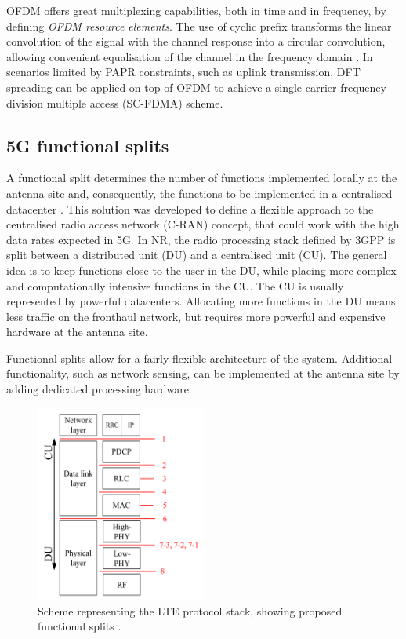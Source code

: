 	OFDM offers great multiplexing capabilities, both in time and in frequency, by defining  \textit{OFDM resource elements}. The use of cyclic prefix transforms the linear convolution of the signal with the channel response into a circular convolution, allowing convenient equalisation of the channel in the frequency domain \cite{Wild_Grudnitsky_Mandelli_Henninger_Guan_Schaich_2023}. In scenarios limited by PAPR constraints, such as uplink transmission, DFT spreading can  be applied on top of OFDM to achieve a single-carrier frequency division multiple access (SC-FDMA) scheme.
	
	\subsection{5G functional splits}
	
	A functional split determines the number of functions implemented locally at the antenna site and, consequently, the functions to be implemented in a centralised datacenter \cite{Larsen_Checko_Christiansen_2019}. 
 	This solution was developed to define a flexible approach to the centralised radio access network (C-RAN) concept, that could work with the high data rates expected in 5G. 
	In NR, the radio processing stack defined by 3GPP is split between a distributed unit (DU) and a centralised unit (CU). 
	The general idea is to keep functions close to the user in the DU, while placing more complex and computationally intensive functions in the CU. The CU is usually represented by powerful datacenters.
	Allocating more functions in the DU means less traffic on the fronthaul network, but requires more powerful and expensive hardware at the antenna site.
	 
	Functional splits allow for a fairly flexible architecture of the system. Additional functionality, such as network sensing, can be implemented at the antenna site by adding dedicated processing hardware.

	\begin{figure}[H]
		\centering
		\includegraphics[width=0.5\textwidth]{Images/overview/5Gsplits_Larsen.png}
		\caption{Scheme representing the LTE protocol stack, showing proposed functional splits \cite{Larsen_Checko_Christiansen_2019}. }
		\label{fig:Overview-LTE_stack_splits}
	\end{figure}
	 
